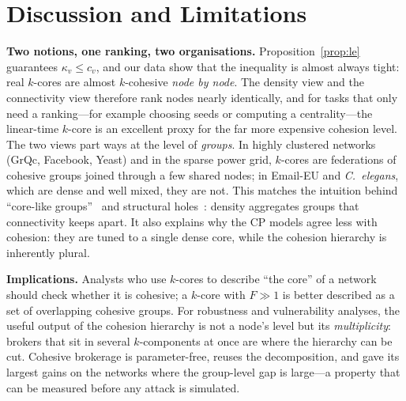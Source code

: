 \documentclass[conference]{IEEEtran}
\newcommand{\coh}{\kappa}
\newcommand{\cn}{c}
\begin{document}
\section{Discussion and Limitations}
\label{sec:discussion}
\textbf{Two notions, one ranking, two organisations.} Proposition~\ref{prop:le} guarantees
$\coh_v\le\cn_v$, and our data show that the inequality is almost always tight: real $k$-cores are
almost $k$-cohesive \emph{node by node}. The density view and the connectivity view therefore rank nodes
nearly identically, and for tasks that only need a ranking---for example choosing seeds or computing a
centrality---the linear-time $k$-core is an excellent proxy for the far more expensive cohesion
level. The two views part ways at the level of \emph{groups}. In highly clustered networks (GrQc,
Facebook, Yeast) and in the sparse power grid, $k$-cores are federations of cohesive groups joined
through a few shared nodes; in Email-EU and \emph{C.~elegans}, which are dense and well mixed, they are
not. This matches the intuition behind ``core-like groups''~\cite{liu2015core} and structural
holes~\cite{burt1992structural}: density aggregates groups that connectivity keeps apart. It also explains why
the CP models agree less with cohesion: they are tuned to a single dense core, while the cohesion
hierarchy is inherently plural.

\textbf{Implications.} Analysts who use $k$-cores to describe ``the core'' of a network should check whether
it is cohesive; a $k$-core with $F\gg1$ is better described as a set of overlapping cohesive groups. For
robustness and vulnerability analyses, the useful output of the cohesion hierarchy is not a node's level
but its \emph{multiplicity}: brokers that sit in several $k$-components at once are where the hierarchy
can be cut. Cohesive brokerage is parameter-free, reuses the decomposition, and gave its largest gains on
the networks where the group-level gap is large---a property that can be measured before any attack is
simulated.
\end{document}
